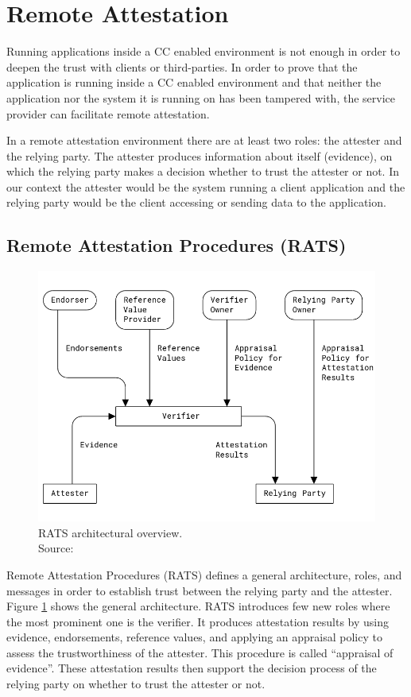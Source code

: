 \section{Remote Attestation}
\label{ch:remote-attestation}

Running applications inside a CC enabled environment is not enough in order to
deepen the trust with clients or third-parties. In order to prove that the
application is running inside a CC enabled environment and that neither the
application nor the system it is running on has been tampered with, the service
provider can facilitate remote attestation.

In a remote attestation environment there are at least two roles: the attester
and the relying party. The attester produces information about itself
(evidence), on which the relying party makes a decision whether to trust the
attester or not. In our context the attester would be the system running a
client application and the relying party would be the client accessing or
sending data to the application.

\subsection{Remote Attestation Procedures (RATS)}
\label{sec:rats}

\begin{figure}
  \centering
  \includegraphics[width=0.7\linewidth]{resources/rats-architecture.png}
  \caption[RATS architectural overview]{
    RATS architectural overview.\\
    Source:  \cite{rfc9334}
  }
  \label{figure:rats-architecture}
\end{figure}

Remote Attestation Procedures (RATS) defines a general architecture, roles, and
messages in order to establish trust between the relying party and the attester.
Figure \ref{figure:rats-architecture} shows the general architecture. RATS
introduces few new roles where the most prominent one is the verifier. It
produces attestation results by using evidence, endorsements, reference values,
and applying an appraisal policy to assess the trustworthiness of the attester.
This procedure is called ``appraisal of evidence''. These attestation results
then support the decision process of the relying party on whether to trust the
attester or not.

